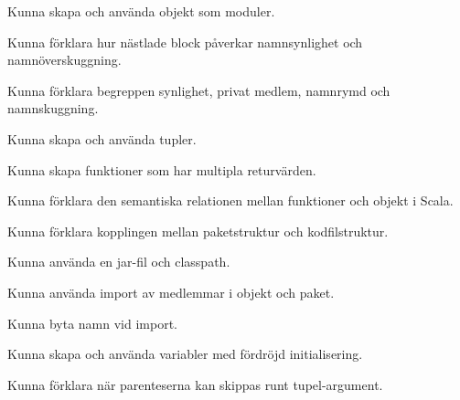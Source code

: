 
\item Kunna skapa och använda objekt som moduler.
\item Kunna förklara hur nästlade block påverkar namnsynlighet och namnöverskuggning.
\item Kunna förklara begreppen synlighet, privat medlem, namnrymd och namnskuggning.

\item Kunna skapa och använda tupler.
\item Kunna skapa funktioner som har multipla returvärden.
\item Kunna förklara den semantiska relationen mellan funktioner och objekt i Scala.

\item Kunna förklara kopplingen mellan paketstruktur och kodfilstruktur.
\item Kunna använda en jar-fil och classpath.

\item Kunna använda import av medlemmar i objekt och paket.
\item Kunna byta namn vid import.

\item Kunna skapa och använda variabler med fördröjd initialisering.
\item Kunna förklara när parenteserna kan skippas runt tupel-argument.
